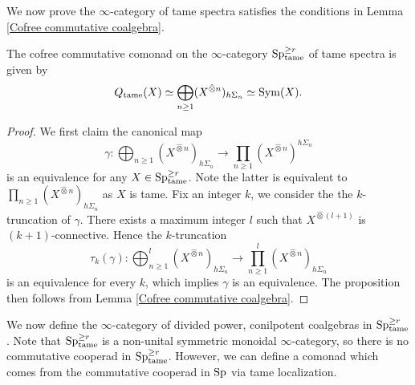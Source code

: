 We now prove the $\infty$-category of tame spectra satisfies the conditions in Lemma
\ref{Cofree commutative coalgebra}.
\begin{proposition}
\label{Cofreee commutative comonad}
	The cofree commutative comonad on the $\infty$-category $\operatorname{Sp}^{\geq r}_{\operatorname{\operatorname{tame}}}$ of tame spectra is given by
	 $$
	 Q_{\operatorname{\operatorname{tame}}}(X) \simeq \bigoplus_{n\geq 1} (X^{\hat{\otimes}n})_{h\Sigma_n} 
	 \simeq
	 \operatorname{Sym}(X) .
	 $$
\end{proposition}
\begin{proof}
We first claim the canonical map 
    $$
	\gamma: \bigoplus_{n\geq 1} (X^{\hat{\otimes}n})_{h\Sigma_n}
	\to 
	\prod_{n\geq 1} (X^{\hat{\otimes}n})^{h\Sigma_n}
	$$
	is an equivalence for any $X \in \operatorname{Sp}^{\geq r}_{\operatorname{\operatorname{tame}}}$.
    Note the latter is equivalent to $\prod_{n\geq 1} (X^{\hat{\otimes}n})_{h\Sigma_n}$ as $X$ is tame.
	Fix an integer $k$, we consider the the $k$-truncation of $\gamma$. There exists a maximum integer $l$ such that $X^{\hat{\otimes}(l+1)}$ is $(k+1)$-connective.
	Hence the $k$-truncation
	$$
	\tau_k (\gamma): \bigoplus_{n\geq 1}^l (X^{\hat{\otimes}n})_{h\Sigma_n}
	\to 
	\prod_{n\geq 1}^l (X^{\hat{\otimes}n})_{h\Sigma_n}
	$$
	 is an equivalence for every $k$, which implies $\gamma$ is an equivalence.
	 The proposition then follows from Lemma
    \ref{Cofree commutative coalgebra}.
	\end{proof}


We now define the $\infty$-category of divided power, conilpotent coalgebras in $\operatorname{Sp}_{\operatorname{\operatorname{tame}}}^{\geq r}$. Note that $\operatorname{Sp}_{\operatorname{\operatorname{tame}}}^{\geq r}$ is a non-unital symmetric monoidal $\infty$-category, so there is no commutative cooperad in $\operatorname{Sp}_{\operatorname{\operatorname{tame}}}^{\geq r}$. However, we can define a comonad which comes from the commutative cooperad in $\operatorname{Sp}$ via tame localization.


